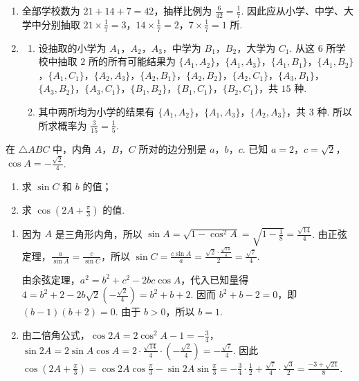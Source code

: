 \begin{solution}
\begin{enumerate}
\item 全部学校数为 \(21+14+7=42\)，抽样比例为 \(\frac{6}{42}=\frac17\). 因此应从小学、中学、大学中分别抽取 \(21\times\frac17=3\)，\(14\times\frac17=2\)，\(7\times\frac17=1\) 所.
\item
\begin{enumerate}
\item 设抽取的小学为 \(A_1\)，\(A_2\)，\(A_3\)，中学为 \(B_1\)，\(B_2\)，大学为 \(C_1\). 从这 \(6\) 所学校中抽取 \(2\) 所的所有可能结果为 \(\{A_1,A_2\}\)，\(\{A_1,A_3\}\)，\(\{A_1,B_1\}\)，\(\{A_1,B_2\}\)，\(\{A_1,C_1\}\)，\(\{A_2,A_3\}\)，\(\{A_2,B_1\}\)，\(\{A_2,B_2\}\)，\(\{A_2,C_1\}\)，\(\{A_3,B_1\}\)，\(\{A_3,B_2\}\)，\(\{A_3,C_1\}\)，\(\{B_1,B_2\}\)，\(\{B_1,C_1\}\)，\(\{B_2,C_1\}\)，共 \(15\) 种.
\item 其中两所均为小学的结果有 \(\{A_1,A_2\}\)，\(\{A_1,A_3\}\)，\(\{A_2,A_3\}\)，共 \(3\) 种. 所以所求概率为 \(\frac{3}{15}=\frac15\).
\end{enumerate}
\end{enumerate}
\end{solution}

\begin{problem}
在 \(\triangle ABC\) 中，内角 \(A\)，\(B\)，\(C\) 所对的边分别是 \(a\)，\(b\)，\(c\). 已知 \(a = 2\)，\(c = \sqrt{2}\)，\(\cos A = -\frac{\sqrt{2}}{4}\).
\begin{enumerate}
\item 求 \(\sin C\) 和 \(b\) 的值；
\item 求 \( \cos\left(2A+\frac{\pi}{3}\right) \) 的值.
\end{enumerate}
\end{problem}

\begin{solution}
\begin{enumerate}
\item 因为 \(A\) 是三角形内角，所以 \(\sin A=\sqrt{1-\cos^2A}=\sqrt{1-\frac18}=\frac{\sqrt{14}}4\). 由正弦定理，\(\frac{a}{\sin A}=\frac{c}{\sin C}\)，所以 \(\sin C=\frac{c\sin A}{a}=\frac{\sqrt2\cdot\frac{\sqrt{14}}4}{2}=\frac{\sqrt7}{4}\).

由余弦定理，\(a^2=b^2+c^2-2bc\cos A\)，代入已知量得 \(4=b^2+2-2b\sqrt2\left(-\frac{\sqrt2}{4}\right)=b^2+b+2\). 因而 \(b^2+b-2=0\)，即 \((b-1)(b+2)=0\). 由于 \(b>0\)，所以 \(b=1\).
\item 由二倍角公式，\(\cos2A=2\cos^2A-1=-\frac34\)，\(\sin2A=2\sin A\cos A=2\cdot\frac{\sqrt{14}}4\cdot\left(-\frac{\sqrt2}{4}\right)=-\frac{\sqrt7}{4}\). 因此 \(\cos\left(2A+\frac{\pi}{3}\right)=\cos2A\cos\frac{\pi}{3}-\sin2A\sin\frac{\pi}{3}=-\frac34\cdot\frac12+\frac{\sqrt7}{4}\cdot\frac{\sqrt3}{2}=\frac{-3+\sqrt{21}}8\).
\end{enumerate}
\end{solution}

